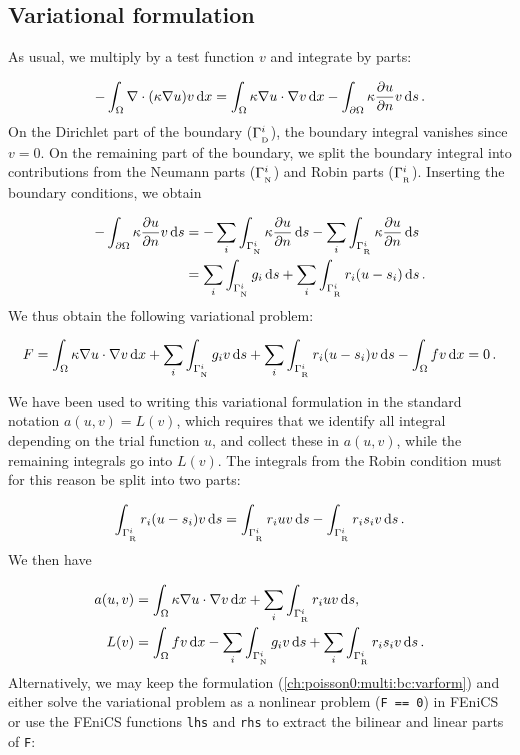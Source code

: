 \documentclass[graybox,envcountchap,sectrefs,final]{svmonodo}
\begin{document}
\subsection{Variational formulation}

As usual, we multiply by a test function $v$ and integrate by parts:

\begin{equation*}
 -\int_\Omega \nabla\cdot(\kappa\nabla u) v \dx
= \int_\Omega \kappa\nabla u\cdot \nabla v \dx -
\int_{\partial\Omega}\kappa\frac{\partial u}{\partial n}v \ds\tp
\end{equation*}
On the Dirichlet part of the boundary ($\GD^i$), the boundary integral
vanishes since $v = 0$. On the remaining part of the boundary, we
split the boundary integral into contributions from the Neumann parts
($\GN^i$) and Robin parts ($\GR^i$). Inserting the boundary conditions,
we obtain

\begin{align*}
-\int_{\partial\Omega} \kappa\frac{\partial u}{\partial n}v \ds
&=
-\sum_i\int_{\GN^i} \kappa\frac{\partial u}{\partial n} \ds
-\sum_i\int_{\GR^i} \kappa\frac{\partial u}{\partial n} \ds\\
&=
\sum_i\int_{\GN^i}g_i \ds +
\sum_i\int_{\GR^i}r_i(u-s_i) \ds\tp
\end{align*}
We thus obtain the following variational problem:

\begin{equation}
F = \int_{\Omega} \kappa\nabla u\cdot \nabla v \dx +
\sum_i\int_{\GN^i} g_iv \ds +
\sum_i\int_{\GR^i}r_i(u-s_i)v \ds
- \int_{\Omega} fv \dx =0\tp
\label{ch:poisson0:multi:bc:varform}
\end{equation}

We have been used to writing this variational formulation in the
standard notation $a(u,v)=L(v)$, which requires that we identify all
integral depending on the trial function $u$, and collect these in
$a(u,v)$, while the remaining integrals go into $L(v)$. The integrals
from the Robin condition must for this reason be split into two parts:

\begin{equation*}
\int_{\GR^i}r_i(u-s_i)v \ds
= \int_{\GR^i} r_iuv \ds - \int_{\GR^i}r_is_iv \ds\tp
\end{equation*}
We then have

\begin{align}
a(u, v) &= \int_{\Omega} \kappa\nabla u\cdot \nabla v \dx
+ \sum_i\int_{\GR^i}r_iuv \ds,
\label{ch:poisson0:2D:DN3:var:a}\\
L(v) &= \int_{\Omega} fv \dx -
\sum_i\int_{\GN^i} g_i v \ds + \sum_i\int_{\GR^i}r_is_iv \ds\tp
\label{ch:poisson0:2D:DN3:var:L}
\end{align}
Alternatively, we may keep the formulation
(\ref{ch:poisson0:multi:bc:varform}) and either solve the variational
problem as a nonlinear problem (\texttt{F == 0}) in FEniCS or use the FEniCS
functions \texttt{lhs} and \texttt{rhs} to extract the bilinear and linear parts of
\texttt{F}:
\end{document}
